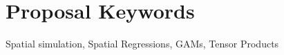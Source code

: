 
\begin{abstract}
	This research aims to compare the performance of spatial regression models that rely on predefined
	weight matrices with that of semi-parametric regression models using spatial smoothers.
\end{abstract}

\section{Proposal Keywords}
Spatial simulation, Spatial Regressions, GAMs, Tensor Products
